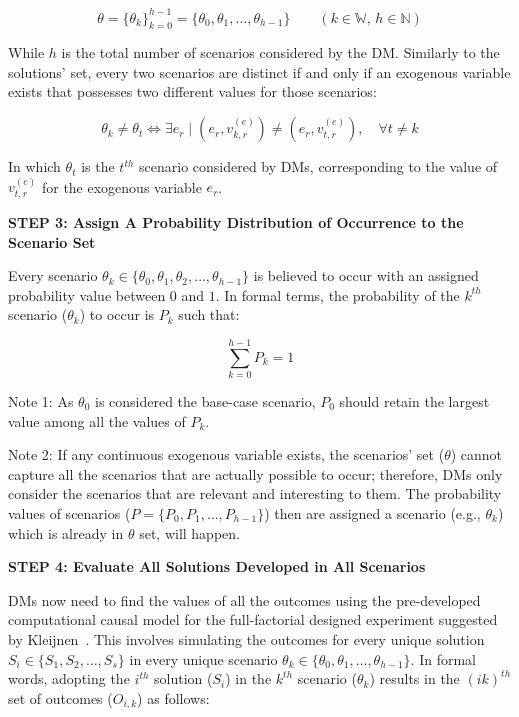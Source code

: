 \documentclass{sfuthesis}
\begin{document}
\begin{equation}
\theta
=
\{\theta_k\}_{k=0}^{h-1}
=
\{\theta_0,\theta_1,\ldots,\theta_{h-1}\}
\qquad (k\in\mathbb{W},\, h\in\mathbb{N})
\end{equation}

While $h$ is the total number of scenarios considered by the DM. Similarly to the solutions' set, every two scenarios are distinct if and only if an exogenous variable exists that possesses two different values for those scenarios:

\begin{equation}
\theta_k \neq \theta_t
\iff
\exists e_r
\;\Big|\;
(e_r,v_{k,r}^{(e)})
\neq
(e_r,v_{t,r}^{(e)}),
\quad \forall t \neq k
\end{equation}

In which $\theta_t$ is the $t^{th}$ scenario considered by DMs, corresponding to the value of $v_{t,r}^{(e)}$ for the exogenous variable $e_r$.\par

\textbf{STEP 3: Assign A Probability Distribution of Occurrence to the Scenario Set}

Every scenario $\theta_k\in\{\theta_0,\theta_1,\theta_2,\ldots,\theta_{h-1}\}$
is believed to occur with an assigned probability value between $0$ and $1$.
In formal terms, the probability of the $k^{th}$ scenario ($\theta_k$) to occur
is $P_k$ such that:

\begin{equation}
\sum_{k=0}^{h-1} P_k = 1
\end{equation}

Note 1: As $\theta_0$ is considered the base-case scenario, $P_0$ should retain the largest value among all the values of $P_k$.\par 
Note 2: If any continuous exogenous variable exists, the scenarios’ set ($\theta$) cannot capture all the scenarios that are actually possible to occur; therefore, DMs only consider the scenarios that are relevant and interesting to them. The probability values of scenarios ($P=\{P_0,P_1,\ldots,P_{h-1}\}$) then are assigned a scenario (e.g., $\theta_k$) which is already in $\theta$ set, will happen.

\textbf{STEP 4: Evaluate All Solutions Developed in All Scenarios}

DMs now need to find the values of all the outcomes using the pre-developed
computational causal model for the full-factorial designed experiment suggested by Kleijnen~\cite{kleijnen1995sensitivity}. This involves simulating the outcomes for every unique solution $S_i\in\{S_1,S_2,\ldots,S_s\}$ in every unique scenario $\theta_k\in\{\theta_0,\theta_1,\ldots,\theta_{h-1}\}$. In formal words, adopting the $i^{th}$ solution ($S_i$) in the $k^{th}$ scenario ($\theta_k$) results in the $({ik})^{th}$ set of outcomes ($O_{i,k}$) as follows:
\end{document}
